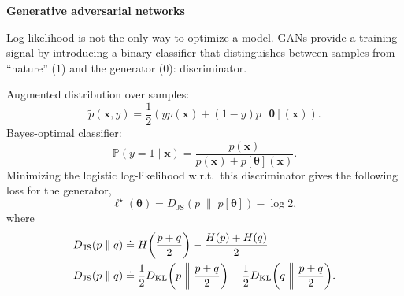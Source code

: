 \documentclass[10pt]{article}
\newenvironment{topic}[1]
{\textbf{\sffamily \footnotesize \colorbox{black}{\rlap{\textbf{\textcolor{white}{#1}}}\hspace{\linewidth}\hspace{-2\fboxsep}}}}
{}
\newenvironment{subtopic}[1]
{\begin{center}\textbf{\footnotesize \sffamily #1}\end{center}}
{}
\renewcommand{\vec}[1]{\ensuremath{\mathbold{#1}}}
\begin{document}
\begin{multicols*}{3}
\begin{topic}{Generative models}
        \begin{subtopic}{Generative adversarial networks}
            Log-likelihood is not the only way to optimize a model. GANs provide a training signal by
            introducing a binary classifier that distinguishes between samples from ``nature'' (1) and the
            generator (0): discriminator.

            Augmented distribution over samples: \[
                \tilde{p}(\vec{x},y) = \frac{1}{2} (yp(\vec{x}) + (1-y)p[\vec{\theta}](\vec{x})).
            \]
            Bayes-optimal classifier: \[
                \mathbb{P}(y=1 \mid \vec{x}) = \frac{p(\vec{x})}{p(\vec{x}) + p[\vec{\theta}](\vec{x})}.
            \]
            Minimizing the logistic log-likelihood w.r.t.\ this discriminator gives the following loss for the
            generator, \[
                \ell^\star(\vec{\theta}) = D_{\mathrm{JS}}(p \;\|\; p[\vec{\theta}]) - \log 2,
            \]
            where
            \begin{align*}
                D_{\mathrm{JS}}(p \;\|\; q) & \doteq H\lft(\frac{p + q}{2} \rgt) - \frac{H(p) + H(q)}{2} \\
                D_{\mathrm{JS}}(p \;\|\; q) & \doteq \frac{1}{2} D_{\mathrm{KL}}\lft( p \;\middle\|\; \frac{p+q}{2} \rgt) + \frac{1}{2} D_{\mathrm{KL}}\lft( q \;\middle\|\; \frac{p+q}{2} \rgt).
            \end{align*}


\end{subtopic}
\end{topic}
\end{multicols*}
\end{document}
